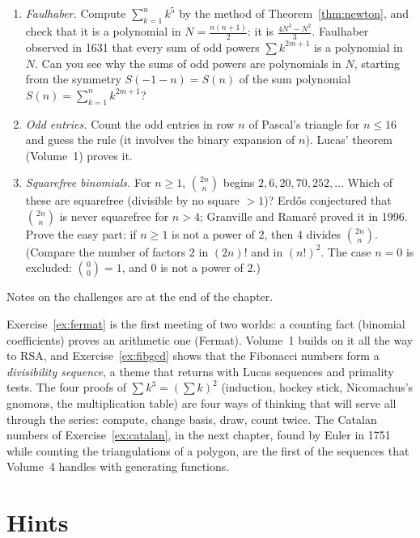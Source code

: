 \begin{challenge}
\begin{enumerate}[label=(\arabic*)]
\item \emph{Faulhaber.} Compute $\sum_{k=1}^nk^5$ by the method of Theorem~\ref{thm:newton}, and check that it is a polynomial in $N=\frac{n(n+1)}2$: it is $\frac{4N^3-N^2}3$.
Faulhaber observed in 1631 that every sum of odd powers $\sum k^{2m+1}$ is a polynomial in $N$. Can you see why the sums of odd powers are polynomials in $N$, starting from the symmetry $S(-1-n)=S(n)$ of the sum polynomial $S(n)=\sum_{k=1}^n k^{2m+1}$?
\item \emph{Odd entries.} Count the odd entries in row $n$ of Pascal's triangle for $n\le16$ and guess the rule (it involves the binary expansion of $n$). Lucas' theorem (Volume~1) proves it.
\item \emph{Squarefree binomials.} For $n\ge1$, $\binom{2n}n$ begins $2,6,20,70,252,\dots$ Which of these are squarefree (divisible by no square $>1$)? Erd\H{o}s conjectured that $\binom{2n}n$ is never squarefree for $n>4$; Granville and Ramar\'e proved it in 1996. Prove the easy part: if $n\ge1$ is not a power of $2$, then $4$ divides $\binom{2n}n$. (Compare the number of factors $2$ in $(2n)!$ and in $(n!)^2$. The case $n=0$ is excluded: $\binom00=1$, and $0$ is not a power of $2$.)
\end{enumerate}
Notes on the challenges are at the end of the chapter.
\end{challenge}

\begin{beauty}
Exercise~\ref{ex:fermat} is the first meeting of two worlds: a counting fact (binomial coefficients)
proves an arithmetic one (Fermat). Volume~1 builds on it all the way to RSA, and Exercise~\ref{ex:fibgcd}
shows that the Fibonacci numbers form a \emph{divisibility sequence}, a theme that returns with
Lucas sequences and primality tests. The four proofs of $\sum k^3=(\sum k)^2$ (induction, hockey stick, Nicomachus's gnomons, the multiplication table) are
four ways of thinking that will serve all through the series: compute, change basis, draw, count twice. The Catalan numbers of Exercise~\ref{ex:catalan}, in the next chapter,
found by Euler in 1751 while counting the triangulations of a polygon, are the first of the sequences that Volume~4 handles with generating functions.
\end{beauty}

\section{Hints}

